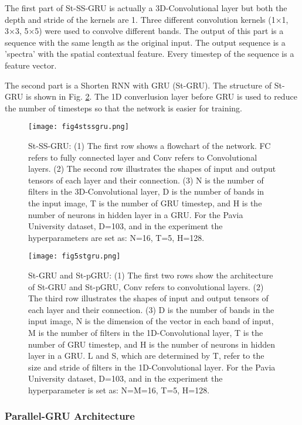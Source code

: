 \documentclass[conference]{IEEEtran}
\begin{document}
The first part of St-SS-GRU is actually a 3D-Convolutional layer but both the depth and
stride of the kernels are 1. Three different convolution kernels (1×1, 3×3, 5×5) were
used to convolve different bands. The output of this part is a sequence with the same
length as the original input. The output sequence is a 'spectra' with the spatial
contextual feature. Every timestep of the sequence is a feature vector.

The second part is a Shorten RNN with GRU (St-GRU). The structure of St-GRU is shown in
Fig. \ref{fig:stgru}. The 1D converlusion layer before GRU is used to reduce the number
of timesteps so that the network is easier for training.

\begin{figure}[htbp]
    \centerline{\texttt{[image: fig4stssgru.png]}}
    \caption{St-SS-GRU: (1) The first row shows a flowchart of the network. FC refers
    to fully connected layer and Conv refers to Convolutional layers. (2) The second
    row illustrates the shapes of input and output tensors of each layer and their
    connection. (3) N is the number of filters in the 3D-Convolutional layer, D is
    the number of bands in the input image, T is the number of GRU timestep, and H
    is the number of neurons in hidden layer in a GRU. For the Pavia University dataset,
    D=103, and in the experiment the hyperparameters are set as: N=16, T=5, H=128.}
    \label{fig:stssgru}
\end{figure}

\begin{figure}[htbp]
    \centerline{\texttt{[image: fig5stgru.png]}}
    \caption{St-GRU and St-pGRU: (1) The first two rows show the architecture of St-GRU
    and St-pGRU, Conv refers to convolutional layers. (2) The third row illustrates the
    shapes of input and output tensors of each layer and their connection. (3) D is the
    number of bands in the input image, N is the dimension of the vector in each band
    of input, M is the number of filters in the 1D-Convolutional layer, T is the number
    of GRU timestep, and H is the number of neurons in hidden layer in a GRU. L and S,
    which are determined by T, refer to the size and stride of filters in the
    1D-Convolutional layer. For the Pavia University dataset, D=103, and in the
    experiment the hyperparameter is set as: N=M=16, T=5, H=128.}
    \label{fig:stgru}
\end{figure}

\subsubsection{Parallel-GRU Architecture}
\end{document}
